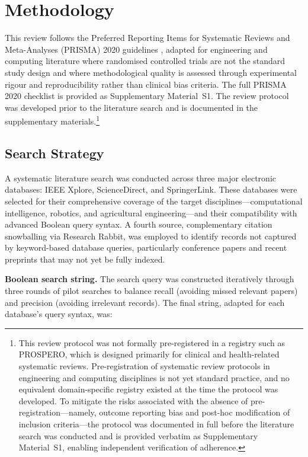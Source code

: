 \documentclass[review,3p,times]{elsarticle}
\begin{document}
\section{Methodology}

This review follows the Preferred Reporting Items for Systematic Reviews and Meta-Analyses (PRISMA) 2020 guidelines \cite{page2021}, adapted for engineering and computing literature where randomised controlled trials are not the standard study design and where methodological quality is assessed through experimental rigour and reproducibility rather than clinical bias criteria. The full PRISMA 2020 checklist is provided as Supplementary Material~S1. The review protocol was developed prior to the literature search and is documented in the supplementary materials.\footnote{This review protocol was not formally pre-registered in a registry such as PROSPERO, which is designed primarily for clinical and health-related systematic reviews. Pre-registration of systematic review protocols in engineering and computing disciplines is not yet standard practice, and no equivalent domain-specific registry existed at the time the protocol was developed. To mitigate the risks associated with the absence of pre-registration---namely, outcome reporting bias and post-hoc modification of inclusion criteria---the protocol was documented in full before the literature search was conducted and is provided verbatim as Supplementary Material~S1, enabling independent verification of adherence.}

\subsection{Search Strategy}

A systematic literature search was conducted across three major electronic databases: IEEE Xplore, ScienceDirect, and SpringerLink. These databases were selected for their comprehensive coverage of the target disciplines---computational intelligence, robotics, and agricultural engineering---and their compatibility with advanced Boolean query syntax. A fourth source, complementary citation snowballing via Research Rabbit, was employed to identify records not captured by keyword-based database queries, particularly conference papers and recent preprints that may not yet be fully indexed.

\textbf{Boolean search string.} The search query was constructed iteratively through three rounds of pilot searches to balance recall (avoiding missed relevant papers) and precision (avoiding irrelevant records). The final string, adapted for each database's query syntax, was:
\end{document}
